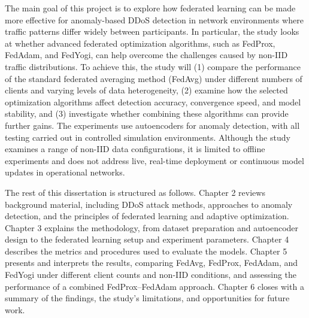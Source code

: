 The main goal of this project is to explore how federated learning can be made more effective for anomaly-based DDoS detection in network environments where traffic patterns differ widely between participants. In particular, the study looks at whether advanced federated optimization algorithms, such as FedProx, FedAdam, and FedYogi, can help overcome the challenges caused by non-IID traffic distributions. To achieve this, the study will (1) compare the performance of the standard federated averaging method (FedAvg) under different numbers of clients and varying levels of data heterogeneity, (2) examine how the selected optimization algorithms affect detection accuracy, convergence speed, and model stability, and (3) investigate whether combining these algorithms can provide further gains. The experiments use autoencoders for anomaly detection, with all testing carried out in controlled simulation environments. Although the study examines a range of non-IID data configurations, it is limited to offline experiments and does not address live, real-time deployment or continuous model updates in operational networks.

The rest of this dissertation is structured as follows. Chapter 2 reviews background material, including DDoS attack methods, approaches to anomaly detection, and the principles of federated learning and adaptive optimization. Chapter 3 explains the methodology, from dataset preparation and autoencoder design to the federated learning setup and experiment parameters. Chapter 4 describes the metrics and procedures used to evaluate the models. Chapter 5 presents and interprets the results, comparing FedAvg, FedProx, FedAdam, and FedYogi under different client counts and non-IID conditions, and assessing the performance of a combined FedProx–FedAdam approach. Chapter 6 closes with a summary of the findings, the study’s limitations, and opportunities for future work.

